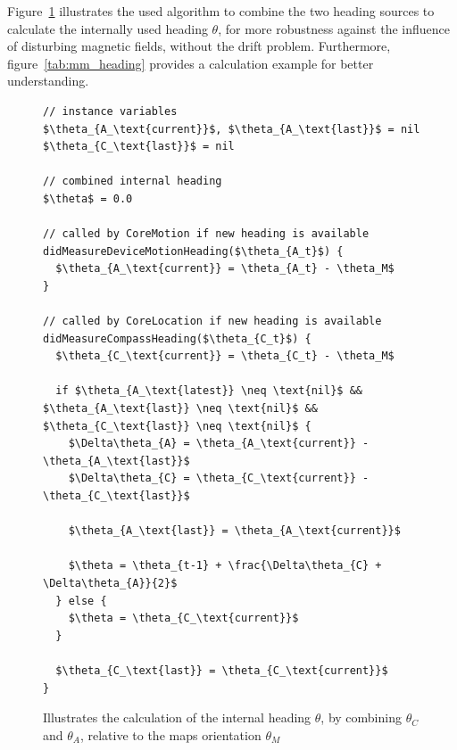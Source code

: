 Figure~\ref{lst:mm_heading} illustrates the used algorithm to combine the two heading sources to calculate the internally used heading $\theta$, for more robustness against the influence of disturbing magnetic fields, without the drift problem. Furthermore, figure~\ref{tab:mm_heading} provides a calculation example for better understanding.

\begin{figure}
\begin{lstlisting}[mathescape]
// instance variables
$\theta_{A_\text{current}}$, $\theta_{A_\text{last}}$ = nil
$\theta_{C_\text{last}}$ = nil

// combined internal heading
$\theta$ = 0.0

// called by CoreMotion if new heading is available
didMeasureDeviceMotionHeading($\theta_{A_t}$) {
  $\theta_{A_\text{current}} = \theta_{A_t} - \theta_M$
}

// called by CoreLocation if new heading is available
didMeasureCompassHeading($\theta_{C_t}$) {
  $\theta_{C_\text{current}} = \theta_{C_t} - \theta_M$
  
  if $\theta_{A_\text{latest}} \neq \text{nil}$ && $\theta_{A_\text{last}} \neq \text{nil}$ && $\theta_{C_\text{last}} \neq \text{nil}$ {
    $\Delta\theta_{A} = \theta_{A_\text{current}} - \theta_{A_\text{last}}$
    $\Delta\theta_{C} = \theta_{C_\text{current}} - \theta_{C_\text{last}}$
    
    $\theta_{A_\text{last}} = \theta_{A_\text{current}}$
    
    $\theta = \theta_{t-1} + \frac{\Delta\theta_{C} + \Delta\theta_{A}}{2}$
  } else {
    $\theta = \theta_{C_\text{current}}$
  }
  
  $\theta_{C_\text{last}} = \theta_{C_\text{current}}$
}
\end{lstlisting}
\caption{Illustrates the calculation of the internal heading $\theta$, by combining $\theta_C$ and $\theta_A$, relative to the maps orientation $\theta_M$}
\label{lst:mm_heading}
\end{figure}

